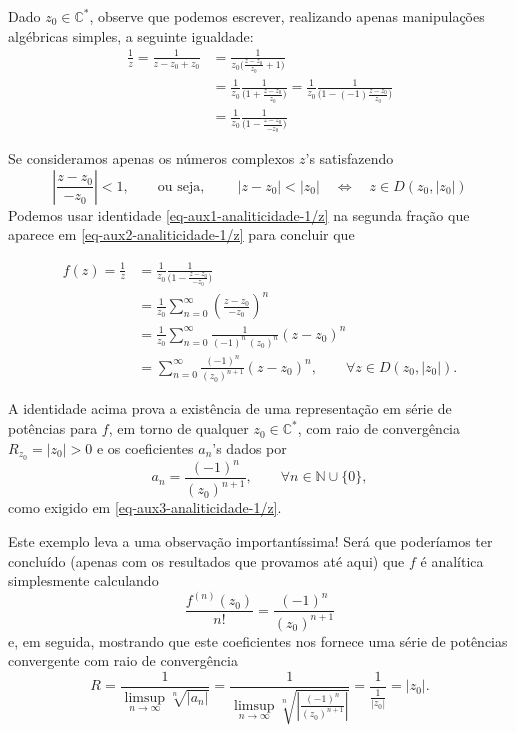 Dado $z_0\in\mathbb{C}^{*}$, 
observe que podemos escrever, realizando apenas manipulações algébricas simples,
a seguinte igualdade:
\begin{align}\label{eq-aux2-analiticidade-1/z}
\frac{1}{z}
=
\frac{1}{z-z_0+z_0} 
&= 
\frac{1}{\displaystyle z_0\Big( \frac{z-z_0}{z_0}  + 1\Big) } 
\nonumber\\[0.3cm]
&=
\frac{1}{z_0} \frac{1}{\displaystyle\Big( 1+\frac{z-z_0}{z_0}\Big) } 
=
\frac{1}{z_0} \frac{1}{\displaystyle\Big( 1-(-1)\frac{z-z_0}{z_0}\Big) } 
\nonumber\\
&=
\frac{1}{z_0} \frac{1}{\displaystyle\Big( 1-\frac{z-z_0}{-z_0}\Big) } 
\end{align}

Se consideramos apenas os números complexos $z$'s satisfazendo 
\[
\left| \frac{z-z_0}{-z_0} \right|<1, \qquad \text{ou seja},\qquad \ |z-z_0|<|z_0| 
\quad \Longleftrightarrow \quad z\in D(z_0,|z_0|)
\]
Podemos usar identidade \eqref{eq-aux1-analiticidade-1/z} 
na segunda fração que aparece em 
\eqref{eq-aux2-analiticidade-1/z} para concluir que 

\begin{align*}
f(z)
=
\frac{1}{z}
&=
\frac{1}{z_0} \frac{1}{\displaystyle\Big( 1-\frac{z-z_0}{-z_0}\Big) } 
\\[0.3cm]
&=
\frac{1}{z_0}\sum_{n=0}^{\infty} \left( \frac{z-z_0}{-z_0} \right)^n
\\[0.3cm]
&=
\frac{1}{z_0}\sum_{n=0}^{\infty}\frac{1}{(-1)^n \, (z_0)^n} (z-z_0)^n
\\[0.3cm]
&=
\sum_{n=0}^{\infty}\frac{(-1)^n}{(z_0)^{n+1}} (z-z_0)^n,
\qquad \forall z\in D(z_0,|z_0|).
\end{align*}

A identidade acima prova a existência de uma representação 
em série de potências para $f$, em torno de qualquer $z_0\in\mathbb{C}^{*}$, 
com raio de convergência $R_{z_0}=|z_0|>0$
e os coeficientes $a_n$'s dados por 
\[
a_n = \frac{(-1)^n}{(z_0)^{n+1}} ,\qquad \forall n\in\mathbb{N}\cup\{0\},
\]
como exigido em \eqref{eq-aux3-analiticidade-1/z}.


\bigskip

Este exemplo leva a uma observação importantíssima! 
Será que poderíamos ter concluído (apenas com os resultados que provamos até aqui) 
que $f$ é analítica 
simplesmente calculando 
\[
\frac{f^{(n)}(z_0)}{n!} = \frac{(-1)^n}{(z_0)^{n+1}}
\]
e, em seguida, mostrando que este coeficientes nos fornece uma série de
potências convergente com raio de convergência
\[
R 
= 
\frac{1}{\displaystyle\limsup_{n\to\infty} \sqrt[n]{|a_n|}}
=
\frac{1}{\displaystyle\limsup_{n\to\infty} \sqrt[n]{\left|\frac{(-1)^n}{(z_0)^{n+1}}\right|}}
=
\frac{1}{\displaystyle\frac{1}{|z_0|}}
=
|z_0|.
\]

